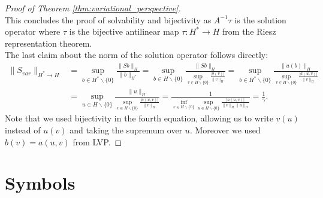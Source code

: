 \documentclass[12pt,journal,compsoc, onecolumn]{IEEEtran}
\begin{document}
\begin{proof}[Proof of Theorem \ref{thm:variational_perspective}]
    \\
    This concludes the proof of solvability and bijectivity as $A^{-1} \tau$ is the solution operator where $\tau$ is the bijective antilinear map $\tau: H^* \rightarrow H$ from the Riesz representation theorem. \\
    The last claim about the norm of the solution operator follows directly: 
    \begin{align*}
    \|S_{var}\|_{H^* \rightarrow H} & = \sup\limits_{b \in H^*\backslash \{0\}}\frac{\|Sb\|_{H}}{\|b\|_{H^*}} = 
    \sup\limits_{b \in H\backslash \{0\}}\frac{\|Sb\|_{H}}{\sup\limits_{v\in H\backslash \{0\}} \frac{|b(v)|}{\|v\|_H}} = 
    \sup\limits_{b \in H^*\backslash \{0\}}\frac{\|u(b)\|_{H}}{\sup\limits_{v\in H\backslash \{0\}} \frac{|a(u, v)|}{\|v\|_H}} \\
    & = \sup\limits_{u \in H\backslash \{0\}}\frac{\|u\|_{H}}{\sup\limits_{v\in H\backslash \{0\}} \frac{|a(u,v)|}{\|v\|_H}} = \frac{1}{\inf\limits_{v\in H\backslash \{0\}}\sup\limits_{u \in H\backslash \{0\}}{ \frac{|a(u,v)|}{\|v\|_H\|u\|_{H}} }} = \frac{1}{\gamma}.
    \end{align*}
    Note that we used bijectivity in the fourth equation, allowing us to write $v(u)$ instead of $u(v)$ and taking the supremum over $u$. Moreover we used $b(v) = a(u,v)$ from LVP.
\end{proof}

\newpage
\section*{Symbols}
\end{document}
